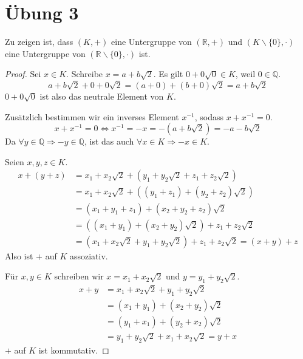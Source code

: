 \documentclass[a4paper,10pt]{article}
\title{}
\author{}
\begin{document}
\maketitle

\section*{Übung 3}



Zu zeigen ist, dass $(K, +)$ eine Untergruppe von $(\mathbb{R}, +)$ und $(K\backslash\{0\}, \cdot)$ eine Untergruppe von $(\mathbb{R}\backslash\{0\}, \cdot)$ ist.

\begin{proof}
 Sei $x \in K$.
 Schreibe $x = a + b\sqrt{2}$.
 Es gilt $0 + 0\sqrt{0} \in K$, weil $0 \in \mathbb{Q}$.
 \begin{equation*}
  a + b\sqrt{2} + 0 + 0\sqrt{2} = (a + 0) + (b + 0)\sqrt{2} = a + b\sqrt{2}
 \end{equation*}
 $0 + 0\sqrt{0}$ ist also das neutrale Element von $K$.
 
 Zusätzlich bestimmen wir ein inverses Element $x^{-1}$, sodass $x + x^{-1} = 0$.
 \begin{equation*}
  x + x^{-1} = 0 \Leftrightarrow x^{-1} = -x = -(a + b\sqrt{2}) = -a - b\sqrt{2}
 \end{equation*}
 Da $\forall y \in \mathbb{Q} \Rightarrow -y \in \mathbb{Q}$, ist das auch $\forall x \in K \Rightarrow -x \in K$.
 
 Seien $x, y, z \in K$.
 \begin{align*}
  x + (y + z) & = x_1 + x_2\sqrt{2} + (y_1 + y_2\sqrt{2} + z_1 + z_2\sqrt{2})\\
  & = x_1 + x_2\sqrt{2} + ((y_1 + z_1) + (y_2 + z_2)\sqrt{2})\\
  & = (x_1 + y_1 + z_1) + (x_2 + y_2 + z_2)\sqrt{2}\\
  & = ((x_1 + y_1) + (x_2 + y_2)\sqrt{2}) + z_1 + z_2\sqrt{2}\\
  & = (x_1 + x_2\sqrt{2} + y_1 + y_2\sqrt{2}) + z_1 + z_2\sqrt{2} = (x + y) + z
 \end{align*}
 Also ist $+$ auf $K$ assoziativ.
 
 Für $x, y \in K$ schreiben wir $x = x_1 + x_2\sqrt{2}$ und $y = y_1 + y_2\sqrt{2}$.
 \begin{align*}
  x + y & = x_1 + x_2\sqrt{2} + y_1 + y_2\sqrt{2}\\
  & = (x_1 + y_1) + (x_2 + y_2)\sqrt{2}\\
  & = (y_1 + x_1) + (y_2 + x_2)\sqrt{2}\\
  & = y_1 + y_2\sqrt{2} + x_1 + x_2\sqrt{2} = y + x
 \end{align*}
 $+$ auf $K$ ist kommutativ.
 

\end{proof}
\end{document}
